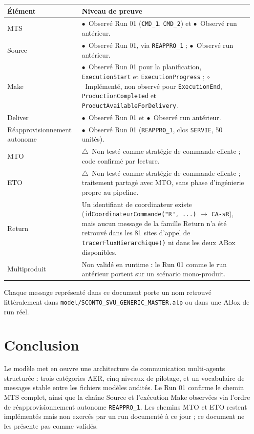 \documentclass[11pt,a4paper]{article}
\newcommand{\code}[1]{\texttt{#1}}
\newcommand{\stRUN}{\ensuremath{\bullet}~Observé Run 01}
\newcommand{\stANT}{\ensuremath{\bullet}~Observé run antérieur}
\newcommand{\stIMP}{\ensuremath{\circ}~Implémenté, non observé}
\newcommand{\stNT}{\ensuremath{\triangle}~Non testé}
\begin{document}
\begin{center}
\begin{tabularx}{\textwidth}{lX}
\toprule
Élément & Niveau de preuve \\
\midrule
MTS & \stRUN{} (\code{CMD\_1}, \code{CMD\_2}) et \stANT. \\
Source & \stRUN{}, via \code{REAPPRO\_1} ; \stANT. \\
Make & \stRUN{} pour la planification, \code{ExecutionStart} et \code{ExecutionProgress} ; \stIMP{} pour \code{ExecutionEnd}, \code{ProductionCompleted} et \code{ProductAvailableForDelivery}. \\
Deliver & \stRUN{} et \stANT. \\
Réapprovisionnement autonome & \stRUN{} (\code{REAPPRO\_1}, clos \code{SERVIE}, 50 unités). \\
MTO & \stNT{} comme stratégie de commande cliente ; code confirmé par lecture. \\
ETO & \stNT{} comme stratégie de commande cliente ; traitement partagé avec MTO, sans phase d'ingénierie propre au pipeline. \\
Return & Un identifiant de coordinateur existe (\code{idCoordinateurCommande("R", ...)} $\to$ \code{CA-sR}), mais aucun message de la famille Return n'a été retrouvé dans les 81 sites d'appel de \code{tracerFluxHierarchique()} ni dans les deux ABox disponibles. \\
Multiproduit & Non validé en runtime : le Run 01 comme le run antérieur portent sur un scénario mono-produit. \\
\bottomrule
\end{tabularx}
\end{center}

Chaque message représenté dans ce document porte un nom retrouvé littéralement dans \code{model/\allowbreak{}SCONTO\_SVU\_GENERIC\_MASTER.alp} ou dans une ABox de run réel.

\section{Conclusion}

Le modèle met en \oe{}uvre une architecture de communication multi-agents structurée : trois catégories AER, cinq niveaux de pilotage, et un vocabulaire de messages stable entre les fichiers modèles audités. Le Run 01 confirme le chemin MTS complet, ainsi que la chaîne Source et l'exécution Make observées via l'ordre de réapprovisionnement autonome \code{REAPPRO\_1}. Les chemins MTO et ETO restent implémentés mais non exercés par un run documenté à ce jour ; ce document ne les présente pas comme validés.
\end{document}
